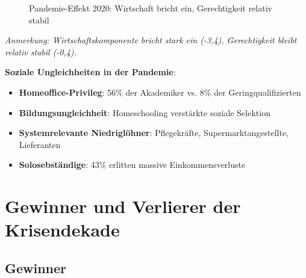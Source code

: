 \begin{figure}[ht]
    \centering
    \caption{Pandemie-Effekt 2020: Wirtschaft bricht ein, Gerechtigkeit relativ stabil}
    \label{fig:pandemie_effekt}
\end{figure}

\begin{flushleft}
\footnotesize{\textit{Anmerkung: Wirtschaftskomponente bricht stark ein (-3,4), Gerechtigkeit bleibt relativ stabil (-0,4).}}
\end{flushleft}

\textbf{Soziale Ungleichheiten in der Pandemie}:

\begin{itemize}
    \item \textbf{Homeoffice-Privileg}: 56\% der Akademiker vs. 8\% der Geringqualifizierten
    \item \textbf{Bildungsungleichheit}: Homeschooling verstärkte soziale Selektion
    \item \textbf{Systemrelevante Niedriglöhner}: Pflegekräfte, Supermarktangestellte, Lieferanten
    \item \textbf{Solosebständige}: 43\% erlitten massive Einkommensverluste
\end{itemize}

\section{Gewinner und Verlierer der Krisendekade}

\subsection{Gewinner}

